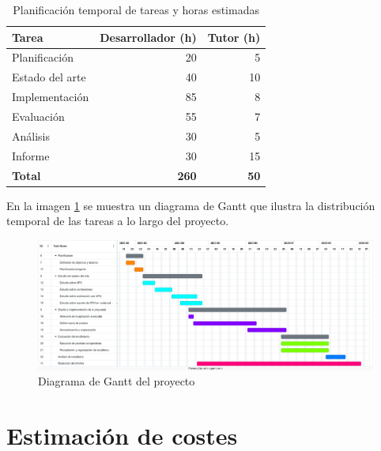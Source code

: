 \begin{table}[!ht]
      \centering
      \setlength{\tabcolsep}{3pt}
      \renewcommand{\arraystretch}{1.1}
      \begin{tabular}{|p{3cm}|r|r|}
            \hline
            \textbf{Tarea}  & \textbf{Desarrollador (h)} & \textbf{Tutor (h)} \\
            \hline
            Planificación   & 20                         & 5                  \\
            Estado del arte & 40                         & 10                 \\
            Implementación  & 85                         & 8                  \\
            Evaluación      & 55                         & 7                  \\
            Análisis        & 30                         & 5                  \\
            Informe         & 30                         & 15                 \\
            \hline
            \textbf{Total}  & \textbf{260}               & \textbf{50}        \\
            \hline
      \end{tabular}
      \caption{Planificación temporal de tareas y horas estimadas}
      \label{tab:planificacion-temporal}
\end{table}

En la imagen \ref{fig:diagrama-gantt} se muestra un diagrama de Gantt que ilustra la distribución temporal de las tareas a lo largo del proyecto.

\begin{figure}[!h]
      \centering
      \includegraphics[width=\textwidth]{imagenes/cap2/diagrama_gantt.png}
      \caption{Diagrama de Gantt del proyecto}
      \label{fig:diagrama-gantt}
\end{figure}

\section{Estimación de costes}


